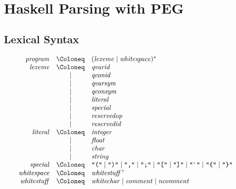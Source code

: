 \section{Haskell Parsing with PEG}

\cite{SimonMarlow:2010}

\subsection{Lexical Syntax}

\begin{align*}
  \begin{array}{rcl}
    \mathit{program}
    & \Coloneq & (\mathit{lexeme} \mid \mathit{whitespace})^* \\
    \mathit{lexeme}
    & \Coloneq & \mathit{qvarid} \\
    & \mid & \mathit{qconid} \\
    & \mid & \mathit{qvarsym} \\
    & \mid & \mathit{qconsym} \\
    & \mid & \mathit{literal} \\
    & \mid & \mathit{special} \\
    & \mid & \mathit{reservedop} \\
    & \mid & \mathit{reservedid} \\
    \mathit{literal}
    & \Coloneq & \mathit{integer} \\
    & \mid & \mathit{float} \\
    & \mid & \mathit{char} \\
    & \mid & \mathit{string} \\
    \mathit{special}
    & \Coloneq & \text{\texttt{\textquotedbl(\textquotedbl}}
    \mid \text{\texttt{\textquotedbl)\textquotedbl}}
    \mid \text{\texttt{\textquotedbl,\textquotedbl}}
    \mid \text{\texttt{\textquotedbl;\textquotedbl}}
    \mid \text{\texttt{\textquotedbl[\textquotedbl}}
    \mid \text{\texttt{\textquotedbl]\textquotedbl}}
    \mid \text{\texttt{\textquotedbl\textasciigrave\textquotedbl}}
    \mid \text{\texttt{\textquotedbl\{\textquotedbl}}
    \mid \text{\texttt{\textquotedbl\}\textquotedbl}}
    \\
    \mathit{whitespace}
    & \Coloneq & \mathit{whitestuff}^+
    \\
    \mathit{whitestuff}
    & \Coloneq & \mathit{whitechar}
    \mid \mathit{comment}
    \mid \mathit{ncomment}
  \end{array}
\end{align*}

